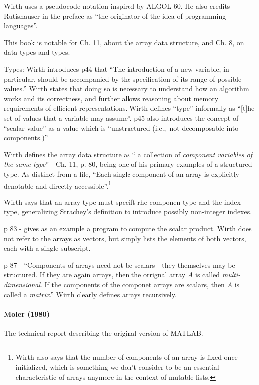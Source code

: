 Wirth uses a pseudocode notation inspired by ALGOL 60. He also credits Rutishauser
in the preface as ``the originator of the idea of programming languages''.

This book is notable for Ch. 11, about the array data structure, and Ch. 8, on data types and types.

Types: Wirth introduces p44 that ``The introduction of a new variable, in particular,
should be accompanied by the specification of
its range of possible values.'' Wirth states that doing so is necessary to understand
how an algorithm works and its correctness, and further allows reasoning about memory requirements
of efficient representations.
Wirth defines ``type'' informally as ``[t]he set of values that a variable may
assume''. p45 also introduces the concept of ``scalar value'' as a value
which is ``unstructured (i.e.,\ not decomposable into components.)''


Wirth defines the array data structure as `` a collection of \textit{component
variables of the same type}'' - Ch. 11, p. 80, being one of his primary
examples of a structured type. As distinct from a file, ``Each single component
of an array is explicitly denotable and directly accessible''.\footnote{Wirth
also says that the number of
components of an array is fixed once initialized, which is something we don't
consider to be an essential characteristic of arrays anymore in the context of
mutable lists.}

Wirth says that an array type must specift rhe componen type and the index type,
generalizing Strachey's definition to introduce possibly non-integer indexes.

p 83 - gives as an example a program to compute the scalar product.
Wirth does not refer to the arrays as vectors, but simply lists the elements of
both vectors, each with a single subscript.

p 87 - ``Components of arrays need not be scalars---they themselves may be structured.
If they are again arrays, then the orrignal array $A$ is called \textit{multi-dimensional}.
If the components of the componet arrays are scalars, then
$A$ is called a \textit{matrix}.'' Wirth clearly defines arrays recursively.


\paragraph{Moler (1980)~\cite{Moler1980}}

The technical report describing the original version of MATLAB.

